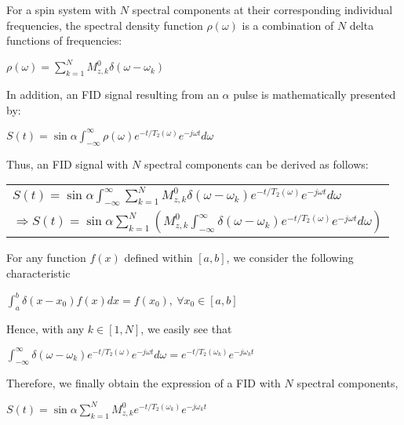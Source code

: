 \documentclass[12pt,oneside]{report}
\newenvironment{tree}[6]{
\begin{list}{#1}{\parskip=0in \topsep=#5 \itemsep=#6 \parsep=0in \partopsep=0in \leftmargin=#2 \rightmargin=#3 \itemindent=#4 \listparindent=\itemindent}
}{\end{list}}
\newenvironment{ssection}[7]{
\framebox{\textbf{#1}} \textbf{#2}
\begin{tree}{#3}{#4}{#5}{\parindent}{#6}{#7}
}{\end{tree}}
\begin{document}
\begin{ssection}{Problem 4.2}{}{}{0in}{0in}{7pt}{0pt}
\item For a spin system with $N$ spectral components at their corresponding individual frequencies, the spectral density function $\rho(\omega)$
is a combination of $N$ delta functions of frequencies:
\begin{center}
$\rho(\omega)=\displaystyle\sum_{k=1}^{N}M^{0}_{z,k}\delta(\omega-\omega_{k})$
\end{center}
In addition, an FID signal resulting from an $\alpha$ pulse is mathematically presented by:
\begin{center}
$S(t)=\displaystyle\sin\alpha\int_{-\infty}^{\infty}\rho(\omega)e^{-t/T_2(\omega)}e^{-j\omega t}d\omega$
\end{center}
Thus, an FID signal with $N$ spectral components can be derived as follows:
\begin{center}
\begin{tabular}{l}
\hphantom{$\Rightarrow\ $}$ S(t)=\displaystyle\sin\alpha\int_{-\infty}^{\infty}\sum_{k=1}^{N}M^{0}_{z,k}\delta(\omega-\omega_{k})
e^{-t/T_2(\omega)}e^{-j\omega t}d\omega$\\
$\Rightarrow S(t)=\displaystyle\sin\alpha\sum_{k=1}^{N}\left(M^{0}_{z,k}\int_{-\infty}^{\infty}
\delta(\omega-\omega_{k})e^{-t/T_2(\omega)}e^{-j\omega t}d\omega\right)$
\end{tabular}
\end{center}
For any function $f(x)$ defined within $[a,b]$, we consider the following characteristic
\begin{center}
$\displaystyle\int_{a}^{b}\delta(x-x_0)f(x)dx=f(x_0),\ \forall x_0 \in [a,b]$
\end{center}
Hence, with any $k \in [1,N]$, we easily see that
\begin{center}
$\displaystyle\int_{-\infty}^{\infty}\delta(\omega-\omega_{k})e^{-t/T_2(\omega)}e^{-j\omega t}d\omega=e^{-t/T_2(\omega_k)}e^{-j\omega_k t}$
\end{center}
Therefore, we finally obtain the expression of a FID with $N$ spectral components,
\begin{center}
$S(t)=\displaystyle\sin\alpha\sum_{k=1}^{N}M^{0}_{z,k}e^{-t/T_2(\omega_k)}e^{-j\omega_k t}$
\end{center}
\end{ssection}
\ \\
\end{document}
